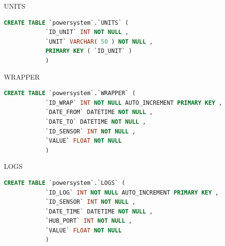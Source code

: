 		UNITS
		\begin{lstlisting}[language=sql, stepnumber=0, tabsize=1]
			CREATE TABLE `powersystem`.`UNITS` (
			`ID_UNIT` INT NOT NULL ,
			`UNIT` VARCHAR( 50 ) NOT NULL ,
			PRIMARY KEY ( `ID_UNIT` )
			)
		\end{lstlisting}
		WRAPPER
		\begin{lstlisting}[language=sql, stepnumber=0, tabsize=1]
			CREATE TABLE `powersystem`.`WRAPPER` (
			`ID_WRAP` INT NOT NULL AUTO_INCREMENT PRIMARY KEY ,
			`DATE_FROM` DATETIME NOT NULL ,
			`DATE_TO` DATETIME NOT NULL ,
			`ID_SENSOR` INT NOT NULL ,
			`VALUE` FLOAT NOT NULL
			)
		\end{lstlisting}
		LOGS
		\begin{lstlisting}[language=sql, stepnumber=0, tabsize=1]
			CREATE TABLE `powersystem`.`LOGS` (
			`ID_LOG` INT NOT NULL AUTO_INCREMENT PRIMARY KEY ,
			`ID_SENSOR` INT NOT NULL ,
			`DATE_TIME` DATETIME NOT NULL ,
			`HUB_PORT` INT NOT NULL ,
			`VALUE` FLOAT NOT NULL
			)
		\end{lstlisting}
	


%	

